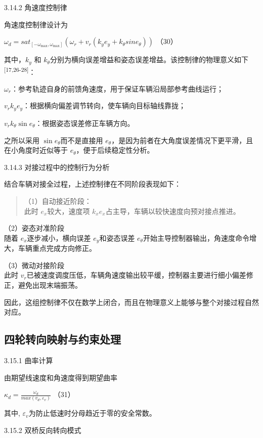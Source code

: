 3.14.2 角速度控制律

角速度控制律设计为

\(\omega_{d} = {sat}_{\left\lbrack - \omega_{\max},\omega_{\max} \right\rbrack}\left( \omega_{r} + v_{r}(k_{y}e_{y} + k_{\theta}sine_{\theta}) \right)\)
（30）

其中，\(k_{y}\) 和
\(k_{\theta}\)分别为横向误差增益和姿态误差增益。该控制律的物理意义如下\textsuperscript{[17,26-28]}：

\(\omega_{r}\)：参考轨迹自身的前馈角速度，用于保证车辆沿局部参考曲线运行；

\(v_{r}k_{y}e_{y}\)：根据横向偏差调节转向，使车辆向目标轴线靠拢；

\(v_{r}k_{\theta}\sin e_{\theta}\)：根据姿态误差修正车辆方向。

之所以采用 \(\sin e_{\theta}\)而不是直接用
\(e_{\theta}\)，是因为前者在大角度误差情况下更平滑，且在小角度时近似等于
\(e_{\theta}\)，便于后续稳定性分析。

3.14.3 对接过程中的控制行为分析

结合车辆对接全过程，上述控制律在不同阶段表现如下：

\begin{quote}
（1）自动接近阶段：\\
此时 \(e_{x}\)较大，速度项
\(k_{x}e_{x}\)占主导，车辆以较快速度向预对接点推进。
\end{quote}

（2）姿态对准阶段\\
随着 \(e_{x}\)逐步减小，横向误差 \(e_{y}\)和姿态误差
\(e_{\theta}\)开始主导控制器输出，角速度命令增大，车辆重点完成方向修正。

（3）微动对接阶段\\
此时
\(v_{r}\)已被速度调度压低，车辆角速度输出较平缓，控制器主要进行细小偏差修正，避免出现末端振荡。

因此，这组控制律不仅在数学上闭合，而且在物理意义上能够与整个对接过程自然对应。

\subsection{四轮转向映射与约束处理}

3.15.1 曲率计算

由期望线速度和角速度得到期望曲率

\(\kappa_{d} = \frac{\omega_{d}}{max(v_{d},\varepsilon_{v})}\) （31）

其中, \(\varepsilon_{v}\)为防止低速时分母趋近于零的安全常数。

3.15.2 双桥反向转向模式

